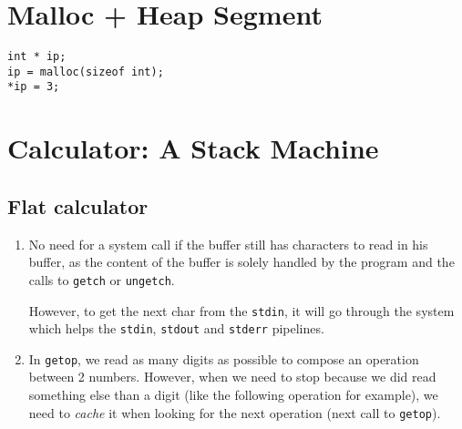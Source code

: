 
\todo{}


%
%
\section{Malloc + Heap Segment}



\begin{lstlisting}
int * ip;
ip = malloc(sizeof int);
*ip = 3;
\end{lstlisting}


\todo{}



\todo{}



%
%
\section{Calculator: A Stack Machine}


\subsection{Flat calculator}


\begin{enumerate}
    \item No need for a system call if the buffer still has characters to read in his buffer, as the content of the buffer is solely handled by the program and the calls to \verb!getch! or \verb!ungetch!.

    However, to get the next char from the \verb!stdin!, it will go through the system which helps the \verb!stdin!, \verb!stdout! and \verb!stderr! pipelines.

    \item In \verb!getop!, we read as many digits as possible to compose an operation between 2 numbers. However, when we need to stop because we did read something else than a digit (like the following operation for example), we need to \emph{cache} it when looking for the next operation (next call to \verb!getop!).
\end{enumerate}


